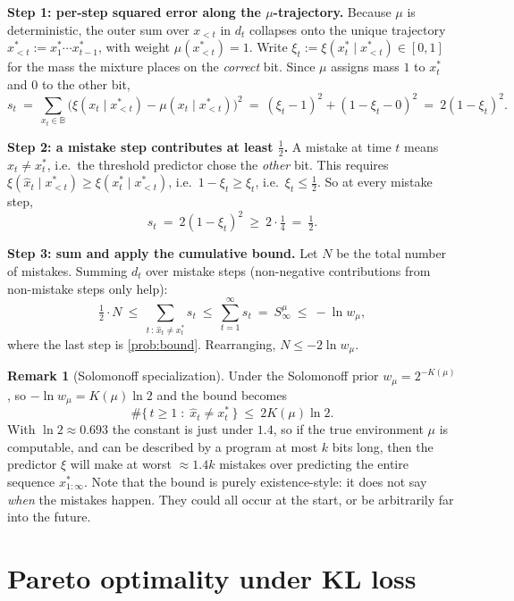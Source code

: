\documentclass[fontsize=11pt, parskip=half]{scrartcl}
\theoremstyle{definition}
\newtheorem{remark}[theorem]{Remark}
\newenvironment{solution}{%
    \begin{tcolorbox}[colback=black!5!white, colframe=black!50!white,
      title={\textbf{Solution}}, fonttitle=\normalfont, breakable]
  }{\end{tcolorbox}}
\newenvironment{solution}{\expandafter\comment}{\expandafter\endcomment}
\begin{document}
\begin{solution}
\textbf{Step 1: per-step squared error along the $\mu$-trajectory.}
Because $\mu$ is deterministic, the outer sum over $x_{<t}$ in $d_t$ collapses
onto the unique trajectory $x_{<t}^* := x_1^* \cdots x_{t-1}^*$, with weight
$\mu(x_{<t}^*) = 1$. Write $\xi_t := \xi(x_t^* \mid x_{<t}^*) \in [0,1]$ for the
mass the mixture places on the \emph{correct} bit. Since $\mu$ assigns mass $1$
to $x_t^*$ and $0$ to the other bit,
\[
  s_t ~=~ \sum_{x_t \in \mathbb{B}} \big(\xi(x_t \mid x_{<t}^*) - \mu(x_t \mid x_{<t}^*)\big)^2
  ~=~ (\xi_t - 1)^2 + (1 - \xi_t - 0)^2 ~=~ 2(1 - \xi_t)^2.
\]

\textbf{Step 2: a mistake step contributes at least $\tfrac12$.}
A mistake at time $t$ means $\hat{x}_t \neq x_t^*$, i.e.\ the threshold predictor
chose the \emph{other} bit. This requires
$\xi(\hat{x}_t \mid x_{<t}^*) \geq \xi(x_t^* \mid x_{<t}^*)$, i.e.\
$1 - \xi_t \geq \xi_t$, i.e.\ $\xi_t \leq \tfrac12$. So at every mistake step,
\[
  s_t ~=~ 2(1 - \xi_t)^2 ~\geq~ 2 \cdot \tfrac{1}{4} ~=~ \tfrac12.
\]

\textbf{Step 3: sum and apply the cumulative bound.}
Let $N$ be the total number of mistakes. Summing $d_t$ over mistake steps
(non-negative contributions from non-mistake steps only help):
\[
  \tfrac12 \cdot N
  ~\leq~ \sum_{t \,:\, \hat{x}_t \neq x_t^*} s_t
  ~\leq~ \sum_{t=1}^\infty s_t ~=~ S^\mu_\infty
  ~\leq~ -\ln w_\mu,
\]
where the last step is \cref{prob:bound}. Rearranging, $N \leq -2 \ln w_\mu$.
\qedhere
\end{solution}

\begin{remark}[Solomonoff specialization]
Under the Solomonoff prior $w_\mu = 2^{-K(\mu)}$, so $-\ln w_\mu = K(\mu)\ln 2$
and the bound becomes
\[
  \#\{\, t \geq 1 \;:\; \hat{x}_t \neq x_t^* \,\} ~\leq~ 2 K(\mu) \ln 2.
\]
With $\ln 2 \approx 0.693$ the constant is just under $1.4$, so if the true 
environment $\mu$ is computable, and can be described by a program at most $k$ bits long, 
then the predictor $\xi$ 
will make at worst $\approx 1.4 k$ mistakes over predicting the entire sequence $x^*_{1:\infty}$.
Note that the bound is purely existence-style: it does not say \emph{when}
the mistakes happen. They could all occur at the start, or be arbitrarily far into the future.
\end{remark}

\section{Pareto optimality under KL loss}\label{prob:kl}
\end{document}
